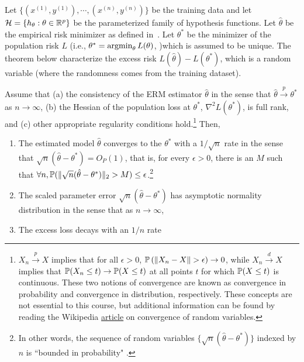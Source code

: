 Let $\{(x^{(1)},y^{(1)}), \cdots, (x^{(n)},y^{(n)})\}$ be the training data and let $\mathcal H = \{ h_\theta: \theta \in \mathbb R^p \}$ be the parameterized family of hypothesis functions. Let $\hat{\theta}$ be the empirical risk minimizer as defined in~. Let $\theta^{*}$ be the minimizer of the population risk $L$ (i.e., $\theta^{*} = \operatorname*{\textup{argmin}}_\theta L(\theta)$, )which is assumed to be unique. The theorem below characterize the excess risk $L(\hat{\theta}) - L(\theta^{*})$, which is a random variable (where the randomness comes from the training dataset). 

\begin{theorem} \label{lec1:thm:asymp}
Assume that (a) the consistency of the ERM estimator $\hat{\theta}$ in the sense that $\hat{\theta}  \overset{p}{\to} \theta^{*}$ as $n \to \infty$, (b) the Hessian of the population loss at $\theta^*$, $\nabla^{2}L(\theta^{*})$, is full rank, and  (c) other appropriate regularity conditions hold.\footnote{$X_n \overset{p}{\to} X$ implies that for all $\epsilon > 0$, $\mathbb P \left (\|X_n - X\| > \epsilon \right ) \to 0$, while $X_n \overset{d}{\to} X$ implies that $\mathbb P(X_n \leq t) \to \mathbb P(X \leq t)$ at all points $t$ for which $\mathbb P(X \leq t)$ is continuous. These two notions of convergence are known as convergence in probability and convergence in distribution, respectively. These concepts are not essential to this course, but additional information can be found by reading the Wikipedia \href{https://en.wikipedia.org/wiki/Convergence_of_random_variables}{article} on convergence of random variables.} 
Then,
\begin{enumerate}
    \item The estimated model $\hat{\theta}$ converges to the $\theta^*$ with a $1/\sqrt{n}$ rate in the sense that $\sqrt{n} (\hat{\theta} - \theta^{*}) = O_P(1)$, that is, for every $\epsilon > 0$, there is an $M$ such that $\forall n, \mathbb P (\| \sqrt{n} (\hat{\theta} - \theta^{*}) \|_2 > M) \le \epsilon$.\footnote{In other words, the sequence of random variables $\{ \sqrt{n} (\hat{\theta} - \theta^{*}) \}$ indexed by $n$ is ``bounded in probability" . } 
    \item  The scaled parameter error $\sqrt{n}(\hat{\theta}-\theta^{*})$ has asymptotic normality distribution in the sense that as $n\rightarrow \infty$, 
     \item The excess loss decays with an $1/n$ rate

\end{enumerate}
\end{theorem}
